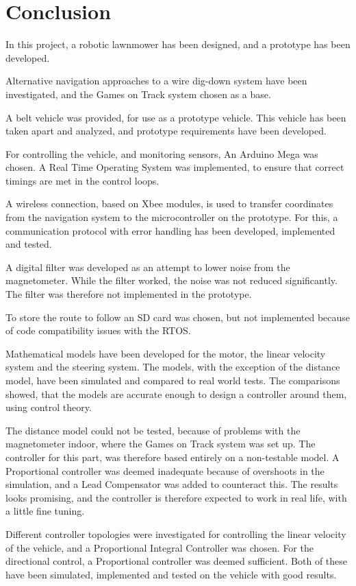 \chapter{Conclusion}\label{cha:conclusion}
In this project, a robotic lawnmower has been designed, and a prototype has been developed.

Alternative navigation approaches to a wire dig-down system have been investigated, and the Games on Track system chosen as a base. 

A belt vehicle was provided, for use as a prototype vehicle. This vehicle has been taken apart and analyzed, and prototype requirements have been developed.

For controlling the vehicle, and monitoring sensors, An Arduino Mega was chosen. A Real Time Operating System was implemented, to ensure that correct timings are met in the control loops.  

A wireless connection, based on Xbee modules, is used to transfer coordinates from the navigation system to the microcontroller on the prototype. For this, a communication protocol with error handling has been developed, implemented and tested.

A digital filter was developed as an attempt to lower noise from the magnetometer. While the filter worked, the noise was not reduced significantly. The filter was therefore not implemented in the prototype.

To store the route to follow an SD card was chosen, but not implemented because of code compatibility issues with the RTOS.

Mathematical models have been developed for the motor, the linear velocity system and the steering system. The models, with the exception of the distance model, have been simulated and compared to real world tests. The comparisons showed, that the models are accurate enough to design a controller around them, using control theory.

The distance model could not be tested, because of problems with the magnetometer indoor, where the Games on Track system was set up. The controller for this part, was therefore based entirely on a non-testable model. A Proportional controller was deemed inadequate because of overshoots in the simulation, and a Lead Compensator was added to counteract this. The results looks promising, and the controller is therefore expected to work in real life, with a little fine tuning.
	
Different controller topologies were investigated for controlling the linear velocity of the vehicle, and a Proportional Integral Controller was chosen. For the directional control, a Proportional controller was deemed sufficient. Both of these have been simulated, implemented and tested on the vehicle with good results.